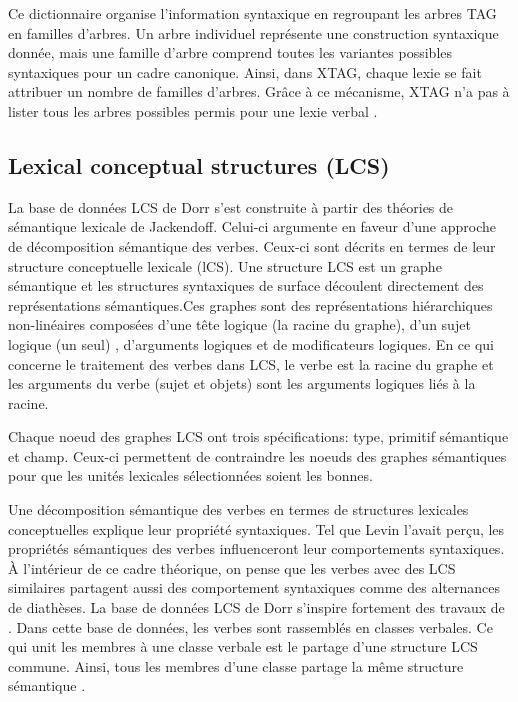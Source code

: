 Ce dictionnaire organise l'information syntaxique en regroupant les arbres \ac{TAG} en familles d'arbres. Un arbre individuel représente une construction syntaxique donnée, mais une famille d'arbre comprend toutes les variantes possibles syntaxiques pour un cadre canonique. Ainsi, dans XTAG, chaque lexie se fait attribuer un nombre de familles d'arbres. Grâce à ce mécanisme, XTAG n'a pas à lister tous les arbres possibles permis pour une lexie verbal \citep{DoranXTAGSystemWide1994}.

\subsection{Lexical conceptual structures (LCS)}
La base de données LCS de Dorr s'est construite à partir des théories de sémantique lexicale de Jackendoff. Celui-ci argumente en faveur d'une approche de décomposition sémantique des verbes. Ceux-ci sont décrits en termes de leur structure conceptuelle lexicale (lCS)\citep{DorrUseLexicalSemantics1992}. Une structure LCS est un graphe sémantique et les structures syntaxiques de surface découlent directement des représentations sémantiques.Ces graphes sont des représentations hiérarchiques non-linéaires composées d'une tête logique (la racine du graphe), d'un sujet logique (un seul) , d'arguments logiques et de modificateurs logiques. En ce qui concerne le traitement des verbes dans LCS, le verbe est la racine du graphe et les arguments du verbe (sujet et objets) sont les arguments logiques liés à la racine.

Chaque noeud des graphes LCS ont trois spécifications: type, primitif sémantique et champ. Ceux-ci permettent de contraindre les noeuds des graphes sémantiques pour que les unités lexicales sélectionnées soient les bonnes.

Une décomposition sémantique des verbes en termes de structures lexicales conceptuelles explique leur propriété syntaxiques. Tel que Levin l'avait perçu, les propriétés sémantiques des verbes influenceront leur comportements syntaxiques. À l'intérieur de ce cadre théorique, on pense que les verbes avec des LCS similaires partagent aussi des comportement syntaxiques comme des alternances de diathèses. La base de données LCS de Dorr s'inspire fortement des travaux de \cite{verb-classes.levin.1993}. Dans cette base de données, les verbes sont rassemblés en classes verbales. Ce qui unit les membres à une classe verbale est le partage d'une structure LCS commune. Ainsi, tous les membres d'une classe partage la même structure sémantique \citep{TraumGenerationLexicalConceptual2000}.

